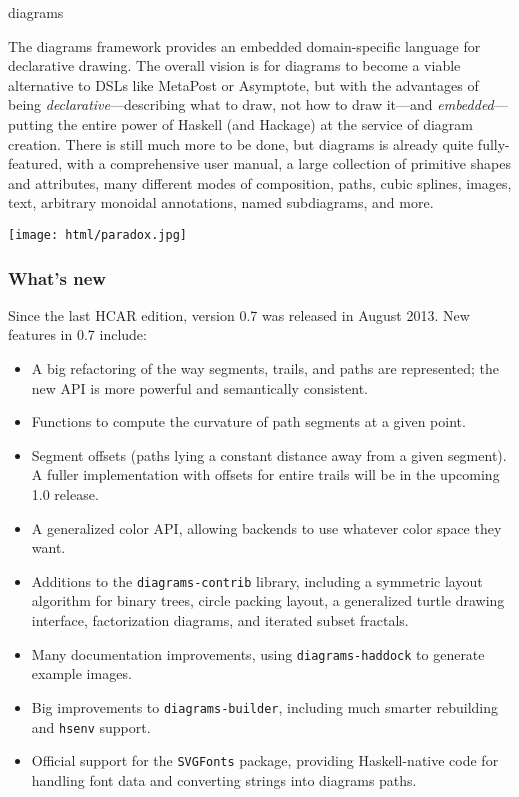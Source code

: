 \begin{hcarentry}[updated]{diagrams}
\makeheader

The diagrams framework provides an embedded domain-specific language
for declarative drawing.  The overall vision is for diagrams to become
a viable alternative to DSLs like MetaPost or Asymptote, but with the
advantages of being \emph{declarative}---describing what to draw, not
how to draw it---and \emph{embedded}---putting the entire power of
Haskell (and Hackage) at the service of diagram creation.  There is
still much more to be done, but diagrams is already quite
fully-featured, with a comprehensive user manual, a large collection
of primitive shapes and attributes, many different modes of
composition, paths, cubic splines, images, text, arbitrary monoidal
annotations, named subdiagrams, and more.

\begin{center}
\texttt{[image: html/paradox.jpg]}
\end{center}

\subsubsection*{What's new}

Since the last HCAR edition, version 0.7 was released in August 2013.
New features in 0.7 include:
\begin{itemize}
\item A big refactoring of the way segments, trails, and paths are
  represented; the new API is more powerful and semantically consistent.
\item Functions to compute the curvature of path segments at a given point.
\item Segment offsets (paths lying a constant distance away
  from a given segment).  A fuller implementation with offsets for
  entire trails will be in the upcoming 1.0 release.
\item A generalized color API, allowing backends to use whatever color
  space they want.
\item Additions to the \texttt{diagrams-contrib} library, including a
  symmetric layout algorithm for binary trees, circle packing layout, a
  generalized turtle drawing interface, factorization diagrams, and
  iterated subset fractals.
\item Many documentation improvements, using \texttt{diagrams-haddock}
  to  generate example images.
\item Big improvements to \texttt{diagrams-builder}, including much
  smarter rebuilding and \texttt{hsenv} support.
\item Official support for the \texttt{SVGFonts} package, providing
  Haskell-native code for handling font data and converting strings
  into diagrams paths.
\end{itemize}


\end{hcarentry}
